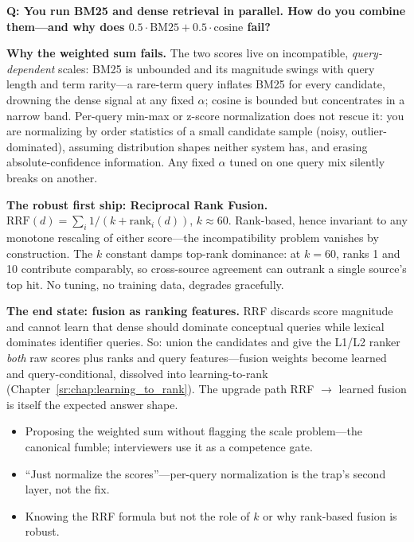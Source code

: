 
\begin{interviewq}
\textbf{Q: You run BM25 and dense retrieval in parallel. How do you combine them---and why does $0.5 \cdot \text{BM25} + 0.5 \cdot \text{cosine}$ fail?}

 \quad {} \quad \badgefreq{\freqhigh}

\stronganswer

\textbf{Why the weighted sum fails.} The two scores live on incompatible, \textit{query-dependent} scales: BM25 is unbounded and its magnitude swings with query length and term rarity---a rare-term query inflates BM25 for every candidate, drowning the dense signal at any fixed $\alpha$; cosine is bounded but concentrates in a narrow band. Per-query min-max or z-score normalization does not rescue it: you are normalizing by order statistics of a small candidate sample (noisy, outlier-dominated), assuming distribution shapes neither system has, and erasing absolute-confidence information. Any fixed $\alpha$ tuned on one query mix silently breaks on another.

\textbf{The robust first ship: Reciprocal Rank Fusion.} $\text{RRF}(d) = \sum_i 1/(k + \text{rank}_i(d))$, $k \approx 60$. Rank-based, hence invariant to any monotone rescaling of either score---the incompatibility problem vanishes by construction. The $k$ constant damps top-rank dominance: at $k = 60$, ranks 1 and 10 contribute comparably, so cross-source agreement can outrank a single source's top hit. No tuning, no training data, degrades gracefully.

\textbf{The end state: fusion as ranking features.} RRF discards score magnitude and cannot learn that dense should dominate conceptual queries while lexical dominates identifier queries. So: union the candidates and give the L1/L2 ranker \textit{both} raw scores plus ranks and query features---fusion weights become learned and query-conditional, dissolved into learning-to-rank (Chapter~\ref{sr:chap:learning_to_rank}). The upgrade path RRF $\to$ learned fusion is itself the expected answer shape.

\redflags
\begin{itemize}
    \item Proposing the weighted sum without flagging the scale problem---the canonical fumble; interviewers use it as a competence gate.
    \item ``Just normalize the scores''---per-query normalization is the trap's second layer, not the fix.
    \item Knowing the RRF formula but not the role of $k$ or why rank-based fusion is robust.
\end{itemize}


\end{interviewq}

